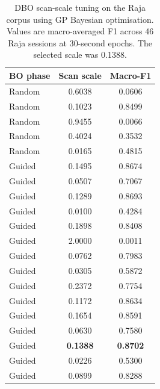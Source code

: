 \begin{table}[t]
    \centering
    \caption{DBO scan-scale tuning on the Raja corpus using GP Bayesian optimisation.
        Values are macro-averaged F1 across 46 Raja sessions at 30-second epochs.
        The selected scale was 0.1388.}
    \label{tab:dbo_scan_scale_tuning}
    \begin{tabular}{lcc}
        \toprule
        \textbf{BO phase} & \textbf{Scan scale} & \textbf{Macro-F1} \\
        \midrule
        Random & 0.6038 & 0.0606 \\
        Random & 0.1023 & 0.8499 \\
        Random & 0.9455 & 0.0066 \\
        Random & 0.4024 & 0.3532 \\
        Random & 0.0165 & 0.4815 \\
        Guided & 0.1495 & 0.8674 \\
        Guided & 0.0507 & 0.7067 \\
        Guided & 0.1289 & 0.8693 \\
        Guided & 0.0100 & 0.4284 \\
        Guided & 0.1898 & 0.8408 \\
        Guided & 2.0000 & 0.0011 \\
        Guided & 0.0762 & 0.7983 \\
        Guided & 0.0305 & 0.5872 \\
        Guided & 0.2372 & 0.7754 \\
        Guided & 0.1172 & 0.8634 \\
        Guided & 0.1654 & 0.8591 \\
        Guided & 0.0630 & 0.7580 \\
        Guided & \textbf{0.1388} & \textbf{0.8702} \\
        Guided & 0.0226 & 0.5300 \\
        Guided & 0.0899 & 0.8288 \\
        \bottomrule
    \end{tabular}
\end{table}
